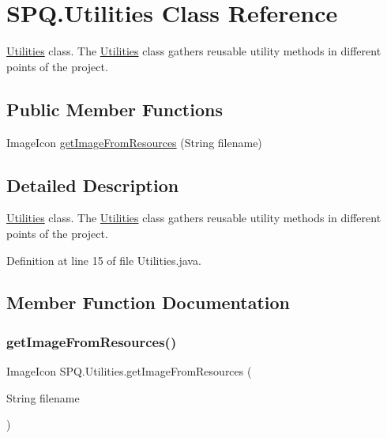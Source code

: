 \hypertarget{class_s_p_q_1_1_utilities}{}\section{S\+P\+Q.\+Utilities Class Reference}
\label{class_s_p_q_1_1_utilities}


\mbox{\hyperlink{class_s_p_q_1_1_utilities}{Utilities}} class. The \mbox{\hyperlink{class_s_p_q_1_1_utilities}{Utilities}} class gathers reusable utility methods in different points of the project.  


\subsection*{Public Member Functions}
\begin{DoxyCompactItemize}
\item 
Image\+Icon \mbox{\hyperlink{class_s_p_q_1_1_utilities_a1ca9779d00f9480c9c0ccb654c558fbb}{get\+Image\+From\+Resources}} (String filename)
\end{DoxyCompactItemize}


\subsection{Detailed Description}
\mbox{\hyperlink{class_s_p_q_1_1_utilities}{Utilities}} class. The \mbox{\hyperlink{class_s_p_q_1_1_utilities}{Utilities}} class gathers reusable utility methods in different points of the project. 

Definition at line 15 of file Utilities.\+java.



\subsection{Member Function Documentation}
\mbox{\label{class_s_p_q_1_1_utilities_a1ca9779d00f9480c9c0ccb654c558fbb}} 
\subsubsection{\texorpdfstring{get\+Image\+From\+Resources()}{getImageFromResources()}}
{\footnotesize\ttfamily Image\+Icon S\+P\+Q.\+Utilities.\+get\+Image\+From\+Resources (\begin{DoxyParamCaption}\item[{String}]{filename }\end{DoxyParamCaption})}

